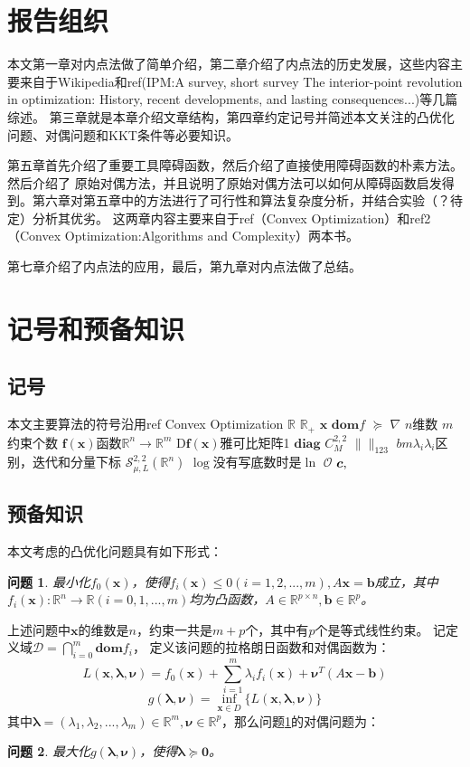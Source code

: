 \documentclass{article}
\newtheorem{problem}{问题}
\begin{document}
\section{报告组织}
本文第一章对内点法做了简单介绍，第二章介绍了内点法的历史发展，这些内容主要来自于Wikipedia和ref(IPM:A survey, short survey The interior-point revolution in optimization: History, recent developments, and lasting consequences...)等几篇综述。
第三章就是本章介绍文章结构，第四章约定记号并简述本文关注的凸优化问题、对偶问题和KKT条件等必要知识。

第五章首先介绍了重要工具障碍函数，然后介绍了直接使用障碍函数的朴素方法。然后介绍了
原始对偶方法，并且说明了原始对偶方法可以如何从障碍函数启发得到。第六章对第五章中的方法进行了可行性和算法复杂度分析，并结合实验（？待定）分析其优劣。
这两章内容主要来自于ref（Convex Optimization）和ref2（Convex Optimization:Algorithms and Complexity）两本书。

第七章介绍了内点法的应用，最后，第九章对内点法做了总结。
\section{记号和预备知识}
\subsection{记号}
本文主要算法的符号沿用ref Convex Optimization
$\mathbb{R}$ $\mathbb{R}_+$
$\bm x$ $\textbf{dom}f$
$\succeq$
$\nabla$
$n$维数 $m$约束个数
$\textbf{f}(\bm x)$函数$\mathbb{R}^n\rightarrow\mathbb{R}^m$
$\text{D}\textbf{f}(\bm x)$雅可比矩阵1
$\textbf{diag}$
$C_M^{2,2}$
$\|\|_123$
$bm\lambda_i \lambda_i$区别，迭代和分量下标
$\mathcal{S}_{\mu,L}^{2,2}(\mathbb{R}^n)$
$\log$没有写底数时是$\ln$
$\mathcal O$
$\bm c,\bm$
\subsection{预备知识}
\label{pre_know}
本文考虑的凸优化问题具有如下形式：
\begin{problem}
最小化$f_0(\bm x)$，使得$f_i(\bm x)\le 0(i=1,2,...,m),A\bm x=\bm{b}$成立，其中$f_i(\bm x):\mathbb{R}^n\rightarrow\mathbb{R}(i=0,1,...,m)$均为凸函数，$A\in\mathbb{R}^{p\times n},\bm b\in\mathbb{R}^p$。
\label{general_convex_prob}
\end{problem}

上述问题中$\bm x$的维数是$n$，约束一共是$m+p$个，其中有$p$个是等式线性约束。
记定义域$\mathcal{D}=\bigcap\limits_{i=0}^{m}\textbf{dom}f_i$，
定义该问题的拉格朗日函数和对偶函数为：
\begin{equation}
    L(\bm x,\bm\lambda, \bm\nu)=f_0(\bm x)+\sum\limits_{i=1}^m\lambda_if_i(\bm x)+\bm\nu^T(A\bm x-\bm b)\label{lagrange_function}
\end{equation}
\begin{equation}
    g(\bm\lambda, \bm\nu)=\inf_{\bm x\in D}\{L(\bm x,\bm\lambda, \bm\nu)\}\label{dual_function}
\end{equation}
其中$\bm\lambda=(\lambda_1,\lambda_2,...,\lambda_m)\in\mathbb R^m,\bm\nu\in\mathbb{R}^p$，那么问题\ref{general_convex_prob}的对偶问题为：
\begin{problem}
最大化$g(\bm\lambda,\bm\nu)$，使得$\bm\lambda\succeq\bm 0$。\label{dual_problem}
\end{problem}
\end{document}
